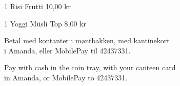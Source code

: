\documentclass{article}
\begin{document}
1 Risi Frutti
\hfill 10,00 kr

\vspace{0.3cm}

1 Yoggi Müsli Top
\hfill 8,00 kr

% 
% 
% 
% 
% 
% 
% 
% 
% 
% 
% 
% 
% 
% 
% 
% 

\vspace{0.5cm}

\begin{center}
\Large\bf

Betal med kontanter i møntbakken, med kantinekort \\ i Amanda, eller MobilePay til 42437331.

{\english Pay with cash in the coin tray, with your canteen card \\ in Amanda,
or MobilePay to 42437331.}

\end{center}

\underskriv
\end{document}
